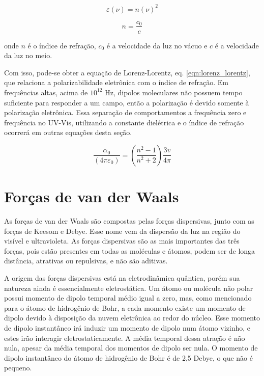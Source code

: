 	\begin{equation}
		\varepsilon(\nu) = n(\nu)^2
		\label{eqn:permissividade_e_indice_refrac}
	\end{equation}
	
	\begin{equation}
		n = \dfrac{c_0}{c}
		\label{eqn:def_n}
	\end{equation}
	
	\noindent onde \(n\) é o índice de refração, \(c_0\) é a velocidade da luz no vácuo e \(c\) é a velocidade da luz no meio.
	
	Com isso, pode-se obter a equação de Lorenz-Lorentz, eq. \ref{eqn:lorenz_lorentz}, que relaciona a polarizabilidade eletrônica com o índice de refração. Em frequências altas, acima de \(10^{12}\) Hz, dipolos moleculares não possuem tempo suficiente para responder a um campo, então a polarização é devido somente à polarização eletrônica. Essa separação de comportamentos a frequência zero e frequência no UV-Vis, utilizando a constante dielétrica e o índice de refração ocorrerá em outras equações desta seção.
	
	\begin{equation}
		\dfrac { \alpha _ { 0 } } { \left( 4 \pi \varepsilon _ { 0 } \right) } = \left( \dfrac { n ^ { 2 } - 1 } { n ^ { 2 } + 2 } \right) \dfrac { 3 v } { 4 \pi }
		\label{eqn:lorenz_lorentz}
	\end{equation}
	\section{Forças de van der Waals}
	
	As forças de van der Waals são compostas pelas forças dispersivas, junto com as forças de Keesom e Debye. Esse nome vem da dispersão da luz na região do visível e ultravioleta. As forças dispersivas são as mais importantes das três forças, pois estão presentes em todas as moléculas e átomos, podem ser de longa distância, atrativas ou repulsivas, e não são aditivas.
	
	A origem das forças dispersivas está na eletrodinâmica quântica, porém sua natureza ainda é essencialmente eletrostática. Um átomo ou molécula não polar possui momento de dipolo temporal médio igual a zero, mas, como mencionado para o átomo de hidrogênio de Bohr, a cada momento existe um momento de dipolo devido à disposição da nuvem eletrônica ao redor do núcleo. Esse momento de dipolo instantâneo irá induzir um momento de dipolo num átomo vizinho, e estes irão interagir eletrostaticamente. A média temporal dessa atração é não nula, apesar da média temporal dos momentos de dipolo ser nula. O momento de dipolo instantâneo do átomo de hidrogênio de Bohr é de 2,5 Debye, o que não é pequeno.
	
